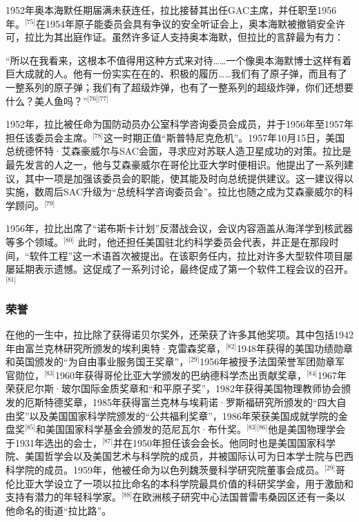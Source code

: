 1952年奥本海默任期届满未获连任，拉比接替其出任GAC主席，并任职至1956年。\(^\text{[75]}\)在1954年原子能委员会具有争议的安全听证会上，奥本海默被撤销安全许可，拉比为其出庭作证。虽然许多证人支持奥本海默，但拉比的言辞最为有力：

“所以在我看来，这根本不值得用这种方式来对待……一个像奥本海默博士这样有着巨大成就的人。他有一份实实在在的、积极的履历……我们有了原子弹，而且有了一整系列的原子弹；我们有了超级炸弹，也有了一整系列的超级炸弹，你们还想要什么？美人鱼吗？”\(^\text{[76][77]}\)

1952年，拉比被任命为国防动员办公室科学咨询委员会成员，并于1956年至1957年担任该委员会主席。\(^\text{[78]}\)这一时期正值“斯普特尼克危机”。1957年10月15日，美国总统德怀特·艾森豪威尔与SAC会面，寻求应对苏联人造卫星成功的对策。拉比是最先发言的人之一，他与艾森豪威尔在哥伦比亚大学时便相识。他提出了一系列建议，其中一项是加强该委员会的职能，使其能及时向总统提供建议。这一建议得以实施，数周后SAC升级为“总统科学咨询委员会”。拉比也随之成为艾森豪威尔的科学顾问。\(^\text{[79]}\)

1956年，拉比出席了“诺布斯卡计划”反潜战会议，会议内容涵盖从海洋学到核武器等多个领域。\(^\text{[80]}\) 此时，他还担任美国驻北约科学委员会代表，并正是在那段时间，“软件工程”这一术语首次被提出。在该职务任内，拉比对许多大型软件项目屡屡延期表示遗憾。这促成了一系列讨论，最终促成了第一个软件工程会议的召开。\(^\text{[81]}\)
\subsubsection{荣誉}
在他的一生中，拉比除了获得诺贝尔奖外，还荣获了许多其他奖项。其中包括1942年由富兰克林研究所颁发的埃利奥特·克雷森奖章，\(^\text{[82]}\)1948年获得的美国功绩勋章和英国颁发的“为自由事业服务国王奖章”，\(^\text{[29]}\)1956年被授予法国荣誉军团勋章军官勋位，\(^\text{[83]}\)1960年获得哥伦比亚大学颁发的巴纳德科学杰出贡献奖章，\(^\text{[84]}\)1967年荣获尼尔斯·玻尔国际金质奖章和“和平原子奖”，1982年获得美国物理教师协会颁发的厄斯特德奖章，1985年获得富兰克林与埃莉诺·罗斯福研究所颁发的“四大自由奖”以及美国国家科学院颁发的“公共福利奖章”，1986年荣获美国成就学院的金盘奖\(^\text{[85]}\)和美国国家科学基金会颁发的范尼瓦尔·布什奖。\(^\text{[83][86]}\)他是美国物理学会于1931年选出的会士，\(^\text{[87]}\)并在1950年担任该会会长。他同时也是美国国家科学院、美国哲学会以及美国艺术与科学院的成员，并被国际认可为日本学士院与巴西科学院的成员。1959年，他被任命为以色列魏茨曼科学研究院董事会成员。\(^\text{[29]}\)哥伦比亚大学设立了一项以拉比命名的本科学院最具价值的科研奖学金，用于激励和支持有潜力的年轻科学家。\(^\text{[88]}\)在欧洲核子研究中心法国普雷韦桑园区还有一条以他命名的街道“拉比路”。

